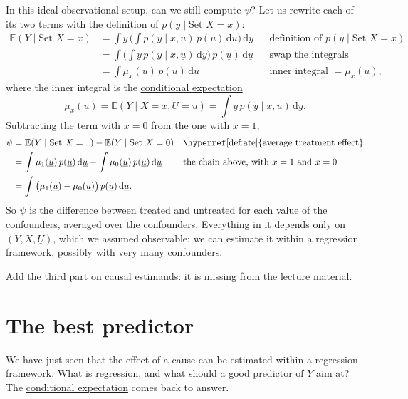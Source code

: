 \documentclass[a4paper,12pt,oneside]{report}
\begin{document}
In this ideal observational setup, can we still compute $\psi$? Let us
rewrite each of its two terms with the definition of
$p(y\mid\text{Set }X=x)$:
\begin{align*}
\mathbb{E}(Y\mid\text{Set }X=x)
&=\int y\,\Big(\int p(y\mid x,\underline{u})\,p(\underline{u})\,\mathrm{d}\underline{u}\Big)\,\mathrm{d}y
&&\text{definition of $p(y\mid\text{Set }X=x)$}\\
&=\int\Big(\int y\,p(y\mid x,\underline{u})\,\mathrm{d}y\Big)\,p(\underline{u})\,\mathrm{d}\underline{u}
&&\text{swap the integrals}\\
&=\int\mu_x(\underline{u})\,p(\underline{u})\,\mathrm{d}\underline{u}
&&\text{inner integral $=\mu_x(\underline{u})$,}
\end{align*}
where the inner integral is the
\hyperref[def:conditional-x]{conditional expectation}
\[
\mu_x(\underline{u})=\mathbb{E}(Y\mid X=x,\underline{U}=\underline{u})
=\int y\,p(y\mid x,\underline{u})\,\mathrm{d}y .
\]
Subtracting the term with $x=0$ from the one with $x=1$,
\begin{align*}
\psi
&=\mathbb{E}(Y\mid\text{Set }X=1)-\mathbb{E}(Y\mid\text{Set }X=0)
&&\text{\hyperref[def:ate]{average treatment effect}}\\
&=\int\mu_1(\underline{u})\,p(\underline{u})\,\mathrm{d}\underline{u}
-\int\mu_0(\underline{u})\,p(\underline{u})\,\mathrm{d}\underline{u}
&&\text{the chain above, with $x=1$ and $x=0$}\\
&=\int\big(\mu_1(\underline{u})-\mu_0(\underline{u})\big)\,p(\underline{u})\,\mathrm{d}\underline{u}.
\end{align*}
So $\psi$ is the difference between treated and untreated for each value
of the confounders, averaged over the confounders. Everything in it
depends only on $(Y,X,\underline{U})$, which we assumed observable: we can
estimate it within a regression framework, possibly with very many
confounders.

\begin{todobox}
Add the third part on causal estimands: it is missing from the lecture
material.
\end{todobox}

\section{The best predictor}\label{sec:best-predictor}

We have just seen that the effect of a cause can be estimated within a
regression framework. What is regression, and what should a good
predictor of $Y$ aim at? The \hyperref[def:conditional]{conditional
expectation} comes back to answer.
\end{document}
